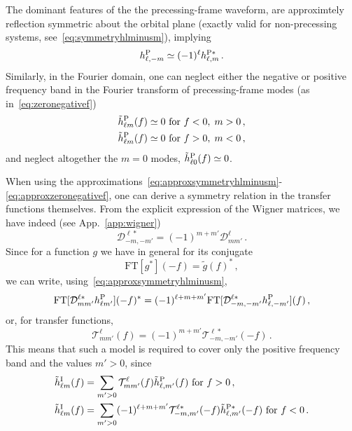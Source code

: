 \documentclass[aps,showpacs,twocolumn,
prd,superscriptaddress,nofootinbib]{revtex4-1}
\newcommand{\be}{\begin{equation}}
\newcommand{\ee}{\end{equation}}
\newcommand\calT{{\mathcal{T}}}
\newcommand\calD{{\mathcal{D}}}
\newcommand{\nn}{\nonumber}
\newcommand{\jgb}[1]{{\color{DarkGreen} #1}}
\begin{document}
\jgb{The dominant features of the the precessing-frame waveform, are approximtely reflection symmetric about the orbital plane (exactly valid for non-precessing systems, see~\eqref{eq:symmetryhlminusm}), implying}
\be\label{eq:approxsymmetryhlminusm}
	h^{\rm P}_{\ell,-m} \simeq (-1)^{\ell} h^{\rm P*}_{\ell,m} \,.
\ee
Similarly, in the Fourier domain, one can neglect either the negative or positive frequency band in the Fourier transform of precessing-frame modes (as in~\eqref{eq:zeronegativef})
\begin{align}\label{eq:approxzeronegativef}
	\tilde{h}_{\ell m}^{\rm P} (f) &\simeq 0 \text{ for } f<0, \; m>0 \nn\,,\\
	\tilde{h}_{\ell m}^{\rm P} (f) &\simeq 0 \text{ for } f>0, \; m<0 \,,
\end{align}
and neglect altogether the $m=0$ modes, $\tilde{h}_{\ell 0}^{\rm P} (f) \simeq 0$.

When using the approximations~\eqref{eq:approxsymmetryhlminusm}-\eqref{eq:approxzeronegativef}, one can derive a symmetry relation in the transfer functions themselves. From the explicit expression of the Wigner matrices, we have indeed (see App.~\ref{app:wigner})
\be
	\calD^{\ell *}_{-m,-m'} = (-1)^{m+m'}\calD^{\ell}_{mm'} \,.
\ee
Since for a function $g$ we have in general for its conjugate
\be
	\mathrm{FT}[g^{*}](-f) = \tilde{g}(f)^{*} \,,
\ee
we can write, using~\eqref{eq:approxsymmetryhlminusm},
\be
	\mathrm{FT}[\calD^{\ell *}_{mm'} h_{\ell m'}^{\rm P}](-f)^{*} = (-1)^{\ell+m+m'} \mathrm{FT}[\calD^{\ell *}_{-m,-m'} h_{\ell, -m'}^{\rm P}](f) \,,
\ee
or, for transfer functions,
\be
	\calT^{\ell}_{mm'}(f) = (-1)^{m+m'} \calT^{\ell *}_{-m,-m'}(-f) \,.
\ee
This means that such a model is required to cover only the positive frequency band and the values $m'>0$, since
\begin{align}\label{eq:hIlmposnegfreq}
	\tilde{h}^{\rm I}_{\ell m}(f) &= \sum_{m'>0} \calT^{\ell}_{mm'}(f) \tilde{h}^{\rm P}_{\ell, m'}(f) \text{ for } f>0 \,, \nn\\
	\tilde{h}^{\rm I}_{\ell m}(f) &= \sum_{m'>0} (-1)^{\ell+m+m'} \calT^{\ell *}_{-m,m'}(-f) \tilde{h}^{\rm P *}_{\ell, m'}(-f) \text{ for } f<0 \,.
\end{align}
\end{document}
